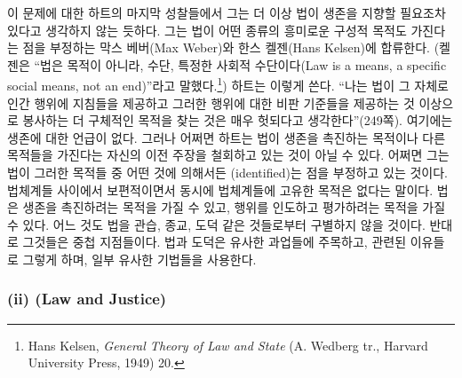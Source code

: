 이 문제에 대한 하트의 마지막 성찰들에서 그는 더 이상 법이 생존을 지향할
필요조차 있다고 생각하지 않는 듯하다. 그는 법이 어떤 종류의 흥미로운
구성적 목적도 가진다는 점을 부정하는 막스 베버(Max Weber)와 한스
켈젠(Hans Kelsen)에 합류한다. (켈젠은 “법은 목적이 아니라, 수단, 특정한
사회적 수단이다(Law is a means, a specific social means, not an
end)”라고 말했다.\footnote{Hans Kelsen, \emph{General Theory of Law and
  State} (A. Wedberg tr., Harvard University Press, 1949) 20.}) 하트는
이렇게 쓴다. “나는 법이 그 자체로 인간 행위에 지침들을 제공하고 그러한
행위에 대한 비판 기준들을 제공하는 것 이상으로 봉사하는 더 구체적인
목적을 찾는 것은 매우 헛되다고 생각한다”(249쪽). 여기에는 생존에 대한
언급이 없다. 그러나 어쩌면 하트는 법이 생존을 촉진하는 목적이나 다른
목적들을 가진다는 자신의 이전 주장을 철회하고 있는 것이 아닐 수 있다.
어쩌면 그는 법이 그러한 목적들 중 어떤 것에 의해서든 (identified)는 점을 부정하고 있는 것이다. 법체계들 사이에서
보편적이면서 동시에 법체계들에 고유한 목적은 없다는 말이다. 법은 생존을
촉진하려는 목적을 가질 수 있고, 행위를 인도하고 평가하려는 목적을 가질
수 있다. 어느 것도 법을 관습, 종교, 도덕 같은 것들로부터 구별하지 않을
것이다. 반대로 그것들은 중첩 지점들이다. 법과 도덕은 유사한 과업들에
주목하고, 관련된 이유들로 그렇게 하며, 일부 유사한 기법들을 사용한다.

\subsubsection{\texorpdfstring{(ii)  (Law and
Justice)}{(ii) 법과 정의 (Law and Justice)}}\label{ii-uxbc95uxacfc-uxc815uxc758-law-and-justice}

